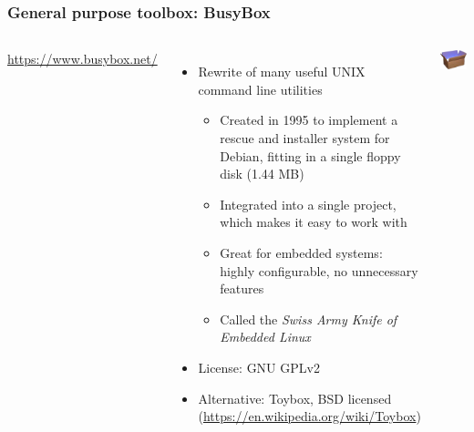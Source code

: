 \begin{frame}
  \frametitle{General purpose toolbox: BusyBox}
  \begin{columns}
      \url{https://www.busybox.net/}
      \begin{itemize}
      \item Rewrite of many useful UNIX command line utilities
        \begin{itemize}
        \item Created in 1995 to implement a rescue and installer
         system for Debian, fitting in a single floppy disk (1.44 MB)
        \item Integrated into a single project, which makes it easy to
          work with
        \item Great for embedded systems: highly configurable,
          no unnecessary features
        \item Called the {\em Swiss Army Knife of Embedded Linux}
        \end{itemize}
      \item License: GNU GPLv2
      \item Alternative: Toybox, BSD licensed (\url{https://en.wikipedia.org/wiki/Toybox})
      \end{itemize}
    \includegraphics[width=\textwidth]{common/busybox.png}
  \end{columns}
\end{frame}

